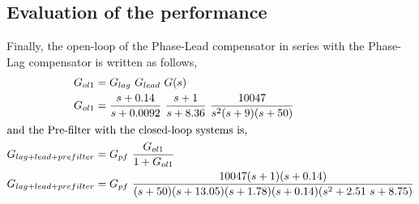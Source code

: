 \documentclass[11pt, a4paper]{article}
\begin{document}
\subsection{Evaluation of the performance}
Finally, the open-loop of the Phase-Lead compensator in series with the Phase-Lag compensator is written as follows,
\begin{align}
G_{ol1} &= G_{lag}~G_{lead} ~G(s) \label{eq:Gol_lead_lag}\\ 
G_{ol1} &= \dfrac{s+0.14}{s+0.0092}~ \dfrac{s+1}{s+8.36}~ \dfrac{10047}{s^2(s+9)(s+50)}  \nonumber\\
\intertext{and the Pre-filter with the closed-loop systems is,}
G_{lag+lead+prefilter} &= G_{pf}~ \dfrac{G_{ol1}}{1+G_{ol1}} \\
G_{lag+lead+prefilter} &= G_{pf}~ \dfrac{10047(s+1)(s+0.14)}{(s+50)(s+13.05)(s+1.78)(s+0.14)(s^2+2.51~s+8.75)} \nonumber
\end{align}
\end{document}

